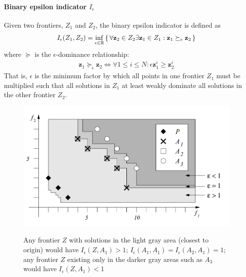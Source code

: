 \paragraph{Binary epsilon indicator $I_\epsilon$} Given two frontiers, $Z_1$ and $Z_2$, the binary epsilon indicator is defined as \cite{zitzler2003performance}
\begin{align}
I_\epsilon (Z_1,Z_2) = \inf_{\epsilon \in \mathbb{R}} \set{\forall \mathbf{z}_2 \in Z_2 \exists \mathbf{z}_1 \in Z_1 : \mathbf{z}_1 \succeq_\epsilon \mathbf{z}_2}
\end{align}
where $\succeq$ is the $\epsilon$-dominance relationship:
\begin{align}
\mathbf{z}_1 \succeq_\epsilon \mathbf{z}_2 \iff \forall 1 \le i \le N : \epsilon \mathbf{z}_1^i \ge \mathbf{z}_2^i
\end{align}
That is, $\epsilon$ is the minimum factor by which all points in one frontier $Z_1$ must be multiplied such that all solutions in $Z_1$ at least weakly dominate all solutions in the other frontier $Z_2$.
\begin{figure}
\centering
\includegraphics[width=.5\textwidth]{../images/BinaryEpsilonFigureLiftedFromZitzler}
\label{fig:binaryEpsilon}
\caption[Breakpoint values for the binary epsilon indicator $I_\epsilon$]{Any frontier $Z$ with solutions in the light gray area (closest to origin) would have $I_\epsilon (Z,A_1) > 1$; $I_\epsilon (A_1,A_1) = I_\epsilon (A_2,A_1) = 1$; any frontier $Z$ existing only in the darker gray areas such as $A_3$ would have $I_\epsilon (Z,A_1) < 1$}
\end{figure}

